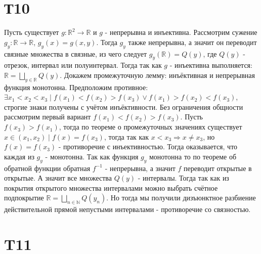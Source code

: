 \documentclass[12pt]{article}
\begin{document}
\section{Т10}
Пусть существует $g:\mathbb{R}^2 \to \mathbb{R}$ и $g$ - непрерывна и инъективна. Рассмотрим сужение $g_y: \mathbb{R} \to \mathbb{R}$, $g_y(x) = g(x, y)$.
Тогда $g_y$ также непрерывна, а значит он переводит связные множества в связные, из чего следует $g_y(\mathbb{R}) = Q(y)$, где $Q(y)$ - отрезок, интервал или полуинтервал.
Тогда так как $g$ - инъективна выполняется: $\mathbb{R} = \bigsqcup_{y \in \mathbb{R}} Q(y)$.
Докажем промежуточную лемму: инъёктивная и непрерывная функция монотонна. Предположим противное:
$\exists x_1 < x_2 < x_3 \mid f(x_1) < f(x_2) > f(x_3) \lor f(x_1) > f(x_2) < f(x_3)$, строгие знаки 
получены с учётом инъёктивности. Без ограничения общности рассмотрим первый вариант $f(x_1) < f(x_2) > f(x_3)$.
Пусть $f(x_3) > f(x_1)$, тогда по теореме о промежуточных значениях существует $x \in (x_1, x_2) \mid f(x) = f(x_3)$, 
тогда так как $x < x_3 \Rightarrow x \not = x_3$, но $f(x) = f(x_3)$ - противоречие с инъективностью.
Тогда оказывается, что каждая из $g_y$ - монотонна. Так как функция $g_y$ монотонна то по теореме об обратной
функции обратная $f^{-1}$ - непрерывна, а значит $f$ переводит открытые в открытые. А значит все множества
$Q(y)$ - интервалы. Тогда так как из покрытия открытого множества интервалами можно выбрать счётное подпокрытие $\mathbb{R} = \bigsqcup_{n \in \mathbb{N}} Q(y_n)$.
Но тогда мы получили дизъюнктное разбиение действительной прямой непустыми интервалами - противоречие со связностью.
\section{T11}
\end{document}
